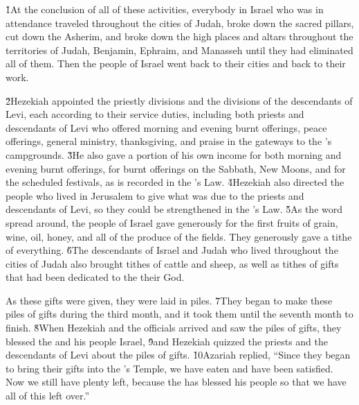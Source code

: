 \v{1}At the conclusion of all of these activities, everybody in Israel who was in attendance traveled throughout the cities of Judah, broke down the sacred pillars, cut down the Asherim, and broke down the high places and altars throughout the territories of Judah, Benjamin, Ephraim, and Manasseh until they had eliminated all of them. Then the people of Israel went back to their cities and back to their work.

\v{2}Hezekiah appointed the priestly divisions and the divisions of the descendants of Levi, each according to their service duties, including both priests and descendants of Levi who offered morning and evening burnt offerings, peace offerings, general ministry, thanksgiving, and praise in the gateways to the 's campgrounds. \v{3}He also gave a portion of his own income for both morning and evening burnt offerings, for burnt offerings on the Sabbath, New Moons, and for the scheduled festivals, as is recorded in the 's Law. \v{4}Hezekiah also directed the people who lived in Jerusalem to give what was due to the priests and descendants of Levi, so they could be strengthened in the 's Law. \v{5}As the word spread around, the people of Israel gave generously for the first fruits of grain, wine, oil, honey, and all of the produce of the fields. They generously gave a tithe of everything. \v{6}The descendants of Israel and Judah who lived throughout the cities of Judah also brought tithes of cattle and sheep, as well as tithes of gifts that had been dedicated to the  their God.

As these gifts were given, they were laid in piles. \v{7}They began to make these piles of gifts during the third month, and it took them until the seventh month to finish. \v{8}When Hezekiah and the officials arrived and saw the piles of gifts, they blessed the  and his people Israel, \v{9}and Hezekiah quizzed the priests and the descendants of Levi about the piles of gifts. \v{10}Azariah replied, ``Since they began to bring their gifts into the 's Temple, we have eaten and have been satisfied. Now we still have plenty left, because the  has blessed his people so that we have all of this left over.''

